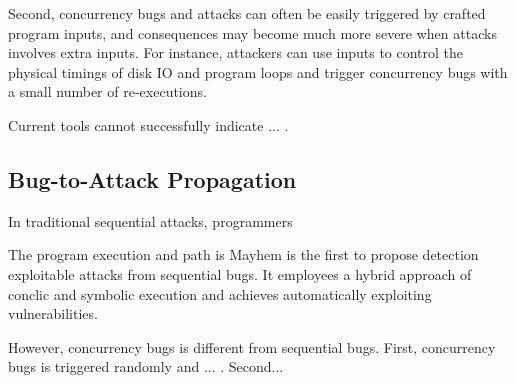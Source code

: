 Second, concurrency bugs and attacks can often be easily
triggered by crafted program inputs, and consequences may 
become much more severe when attacks involves extra inputs.  
For instance, attackers
can use inputs to control the physical timings of disk
IO and program loops and trigger concurrency bugs with a
small number of re-executions. 

Current tools cannot successfully indicate ... .



\subsection{Bug-to-Attack Propagation}

In traditional sequential attacks, programmers 



The program execution and path is 
Mayhem\cite{mayhem:cmu} is the first to propose detection 
exploitable attacks from sequential bugs. It employees a hybrid 
approach of conclic and symbolic execution and achieves automatically 
exploiting vulnerabilities. 

However, concurrency bugs is different from sequential bugs. 
First, concurrency bugs is triggered randomly and ... .
Second...





